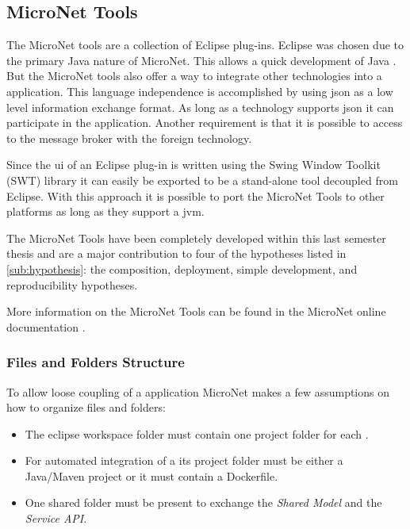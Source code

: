 \subsection{MicroNet Tools}
\label{sub:tools}

The MicroNet tools are a collection of Eclipse plug-ins. Eclipse was chosen due
to the primary Java nature of MicroNet. This allows a quick development of Java
\mss{}. But the MicroNet tools also offer a way to integrate other
technologies into a \ms{} application. This language independence is
accomplished by using \gls{json} as a low level information exchange format. As
long as a technology supports \gls{json} it can participate in the application.
Another requirement is that it is possible to access to the message broker with
the foreign technology.

Since the \gls{ui} of an Eclipse plug-in is written using the Swing
Window Toolkit (SWT) library it can easily be exported to be a stand-alone tool
decoupled from Eclipse. With this approach it is possible to port the MicroNet
Tools to other platforms as long as they support a \gls{jvm}.

The MicroNet Tools have been completely developed within this last semester
thesis and are a major contribution to four of the hypotheses listed in
\autoref{sub:hypothesis}: the composition, deployment, simple development, and 
reproducibility hypotheses.

More information on the MicroNet Tools can be found in the MicroNet online
documentation \cite{micronet2017doku}.

\subsubsection{Files and Folders Structure}

To allow loose coupling of a \ms{} application MicroNet makes a few assumptions
on how to organize files and folders:

\begin{itemize}
  \item The eclipse workspace folder must contain one project folder for each
  \ms{}.
  \item For automated integration of a \ms{} its project folder must be either a
  Java/Maven project or it must contain a Dockerfile.
 \item One shared folder must be present to exchange the \textit{Shared Model} and the
  \textit{Service API}.
\end{itemize}  

